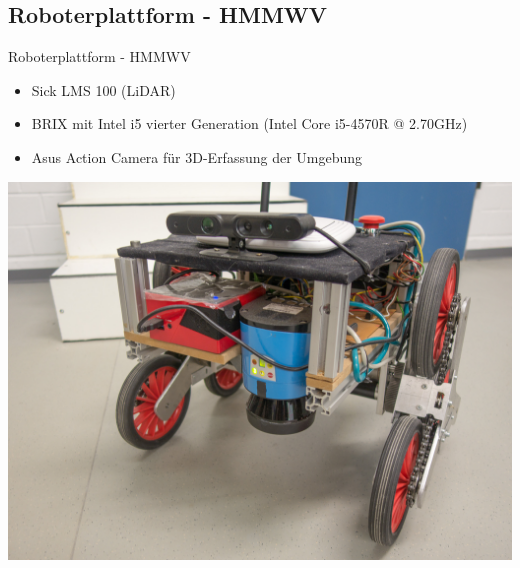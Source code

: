 \documentclass[18pt]{beamer}
\begin{document}
\subsection{Roboterplattform - HMMWV}
\begin{frame}{Roboterplattform - HMMWV}
\begin{itemize}
	\item Sick LMS 100 (LiDAR)
	\item BRIX mit Intel i5 vierter Generation (Intel Core i5-4570R @ 2.70GHz)
	\item Asus Action Camera für 3D-Erfassung der Umgebung
\end{itemize}
\begin{center}
	\includegraphics[scale=0.3]{images/hmmwv.jpg}
\end{center}
\end{frame}
\end{document}
